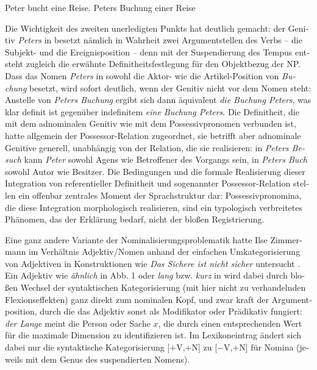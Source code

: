 \documentclass[output=paper,colorlinks,citecolor=brown]{langscibook}
\begin{document}
\begin{otherlanguage}{german}
\ea
\ea 
Peter bucht eine Reise. \label{ex:21a}
\ex Peters Buchung einer Reise \label{ex:21b}
\z
\label{ex:21}
\z

\noindent Die Wichtigkeit des zweiten unerledigten Punkts hat \citet{Zimmermann1991a} deutlich gemacht: der Genitiv \textit{Peters} in  besetzt nämlich in Wahrheit zwei Argumentstellen des Verbs -- die Subjekt- und die Ereignisposition -- denn mit der Suspendierung des Tempus entsteht zugleich die erwähnte Definitheitsfestlegung für den Objektbezug der NP. Dass das Nomen \textit{Peters} in  sowohl die Aktor- wie die Artikel-Position von \textit{Buchung} besetzt, wird sofort deutlich, wenn der Genitiv nicht vor dem Nomen steht: Anstelle von \textit{Peters Buchung} ergibt sich dann äquivalent \textit{die Buchung Peters}, was klar definit ist gegenüber indefinitem \textit{eine Buchung Peters}. Die Definitheit, die mit dem adnominalen Genitiv wie mit dem Possessivpronomen verbunden ist, hatte \citet{Szabolcsi1983} allgemein der Possessor-Relation zugeordnet, sie betrifft aber adnominale Genitive generell, unabhängig von der Relation, die sie realisieren: in \textit{Peters Besuch} kann \textit{Peter} sowohl Agens wie Betroffener des Vorgangs sein, in \textit{Peters Buch} sowohl Autor wie Besitzer. Die Bedingungen und die formale Realisierung dieser Integration von re\-fe\-ren\-tiel\-ler Definitheit und sogenannter Possessor-Relation stellen ein offenbar zentrales Moment der Sprachstruktur dar: Possessivpronomina, die diese Integration morphologisch realisieren, sind ein typologisch verbreitetes Phänomen, das der Erklärung bedarf, nicht der bloßen Registrierung.

Eine ganz andere Variante der Nominalisierungsproblematik hatte Ilse Zimmermann %
im Verhältnis Adjektiv\slash Nomen anhand der einfachen Umkategorisierung von Adjektiven in Konstruktionen wie \textit{Das Sichere ist nicht sicher} untersucht \citep{bi:Zimmermann1988}. Ein Adjektiv wie \textit{ähnlich} in Abb. 1 oder \textit{lang} bzw. \textit{kurz} in  wird dabei durch bloßen Wechsel der syntaktischen Kategorisierung (mit hier nicht zu verhandelnden Flexionseffekten) ganz direkt zum nominalen Kopf, und zwar kraft der Argumentposition, durch die das Adjektiv sonst als Modifikator oder Prädikativ fungiert: \textit{der Lange} meint die Person oder Sache $x$, die durch einen entsprechenden Wert für die maximale Dimension zu identifizieren ist. Im Lexikoneintrag  ändert sich dabei nur die syntaktische Kategorisierung [$+$V,$+$N] zu [$-$V,$+$N] für Nomina (jeweils mit dem Genus des suspendierten Nomens).


\end{otherlanguage}
\end{document}
